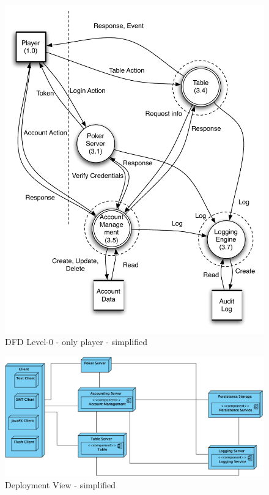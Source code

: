 \documentclass[a4paper,11pt]{report}
\begin{document}
\begin{figure}[h]
  \begin{center}
    \includegraphics[scale=0.8]{dfd_level_0_player_simplified}
  \end{center}
  \caption{DFD Level-0 - only player - simplified}\label{fig:dfd_level_0_player_simplified}
\end{figure}
\begin{figure}[h]
  \begin{center}
    \includegraphics[angle=90,scale=0.65]{deployment_simplified.png}
  \end{center}
  \caption{Deployment View - simplified}\label{fig: deployment_simplified}
\end{figure}
\end{document}
